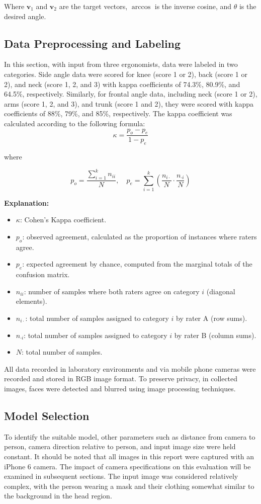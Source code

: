 \documentclass[lettersize,journal]{IEEEtran}
\begin{document}
Where $\mathbf{v}_1$ and $\mathbf{v}_2$ are the target vectors, $\arccos$ is the inverse cosine, and $\theta$ is the desired angle.

\subsection{Data Preprocessing and Labeling}
In this section, with input from three ergonomists, data were labeled in two categories.
Side angle data were scored for knee (score 1 or 2), back (score 1 or 2), and neck (score 1, 2, and 3) with kappa coefficients of 74.3\%, 80.9\%, and 64.5\%, respectively. Similarly, for frontal angle data, including neck (score 1 or 2), arms (score 1, 2, and 3), and trunk (score 1 and 2), they were scored with kappa coefficients of 88\%, 79\%, and 85\%, respectively. The kappa coefficient was calculated according to the following formula:
\[
\kappa = \frac{p_o - p_e}{1 - p_e}
\]

where

\[
p_o = \frac{\sum_{i=1}^k n_{ii}}{N}, \quad
p_e = \sum_{i=1}^k \left( \frac{n_{i\cdot}}{N} \cdot \frac{n_{\cdot i}}{N} \right)
\]

\noindent
\textbf{Explanation:}
\begin{itemize}
    \item $\kappa$: Cohen's Kappa coefficient.
    \item $p_o$: observed agreement, calculated as the proportion of instances where raters agree.
    \item $p_e$: expected agreement by chance, computed from the marginal totals of the confusion matrix.
    \item $n_{ii}$: number of samples where both raters agree on category $i$ (diagonal elements).
    \item $n_{i\cdot}$: total number of samples assigned to category $i$ by rater A (row sums).
    \item $n_{\cdot i}$: total number of samples assigned to category $i$ by rater B (column sums).
    \item $N$: total number of samples.
\end{itemize}

All data recorded in laboratory environments and via mobile phone cameras were recorded and stored in RGB image format.
To preserve privacy, in collected images, faces were detected and blurred using image processing techniques.

\subsection{Model Selection}
To identify the suitable model, other parameters such as distance from camera to person, camera direction relative to person, and input image size were held constant.
It should be noted that all images in this report were captured with an iPhone 6 camera. The impact of camera specifications on this evaluation will be examined in subsequent sections.
The input image was considered relatively complex, with the person wearing a mask and their clothing somewhat similar to the background in the head region.
\end{document}
